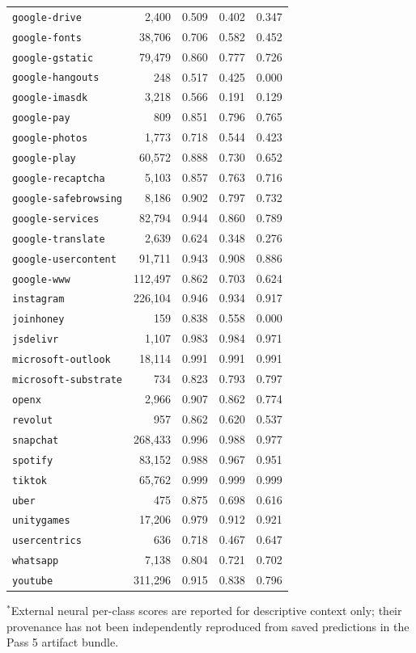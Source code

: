 \documentclass[conference]{IEEEtran}
\begin{document}
\begin{table}[t]
{\begin{tabular*}{\textwidth}{@{\extracolsep{\fill}}lrrrr@{}}
\texttt{google-drive} & 2,400 & 0.509 & 0.402 & 0.347 \\
\texttt{google-fonts} & 38,706 & 0.706 & 0.582 & 0.452 \\
\texttt{google-gstatic} & 79,479 & 0.860 & 0.777 & 0.726 \\
\texttt{google-hangouts} & 248 & 0.517 & 0.425 & 0.000 \\
\texttt{google-imasdk} & 3,218 & 0.566 & 0.191 & 0.129 \\
\texttt{google-pay} & 809 & 0.851 & 0.796 & 0.765 \\
\texttt{google-photos} & 1,773 & 0.718 & 0.544 & 0.423 \\
\texttt{google-play} & 60,572 & 0.888 & 0.730 & 0.652 \\
\texttt{google-recaptcha} & 5,103 & 0.857 & 0.763 & 0.716 \\
\texttt{google-safebrowsing} & 8,186 & 0.902 & 0.797 & 0.732 \\
\texttt{google-services} & 82,794 & 0.944 & 0.860 & 0.789 \\
\texttt{google-translate} & 2,639 & 0.624 & 0.348 & 0.276 \\
\texttt{google-usercontent} & 91,711 & 0.943 & 0.908 & 0.886 \\
\texttt{google-www} & 112,497 & 0.862 & 0.703 & 0.624 \\
\texttt{instagram} & 226,104 & 0.946 & 0.934 & 0.917 \\
\texttt{joinhoney} & 159 & 0.838 & 0.558 & 0.000 \\
\texttt{jsdelivr} & 1,107 & 0.983 & 0.984 & 0.971 \\
\texttt{microsoft-outlook} & 18,114 & 0.991 & 0.991 & 0.991 \\
\texttt{microsoft-substrate} & 734 & 0.823 & 0.793 & 0.797 \\
\texttt{openx} & 2,966 & 0.907 & 0.862 & 0.774 \\
\texttt{revolut} & 957 & 0.862 & 0.620 & 0.537 \\
\texttt{snapchat} & 268,433 & 0.996 & 0.988 & 0.977 \\
\texttt{spotify} & 83,152 & 0.988 & 0.967 & 0.951 \\
\texttt{tiktok} & 65,762 & 0.999 & 0.999 & 0.999 \\
\texttt{uber} & 475 & 0.875 & 0.698 & 0.616 \\
\texttt{unitygames} & 17,206 & 0.979 & 0.912 & 0.921 \\
\texttt{usercentrics} & 636 & 0.718 & 0.467 & 0.647 \\
\texttt{whatsapp} & 7,138 & 0.804 & 0.721 & 0.702 \\
\texttt{youtube} & 311,296 & 0.915 & 0.838 & 0.796 \\
\bottomrule
\end{tabular*}}
\end{table}
\normalsize
\noindent $^{*}$External neural per-class scores are reported for descriptive context only; their provenance has not been independently reproduced from saved predictions in the Pass 5 artifact bundle.
\end{document}
